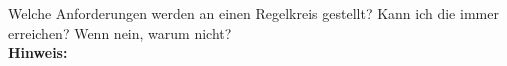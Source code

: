 \begin{question}[section=4,name={Anforderungen},difficulty=4,type=mdl,tags={}]
	Welche Anforderungen werden an einen Regelkreis gestellt? Kann ich die immer erreichen? Wenn nein, warum nicht?
	\\ \textbf{Hinweis:}\\
	
\end{question}
\begin{solution}
	
\end{solution}